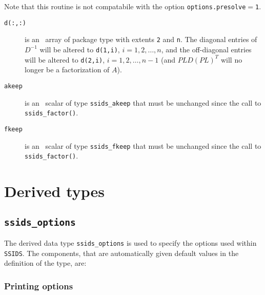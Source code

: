 \vspace{0.3cm}
\noindent
Note that this routine is not compatabile with the option \texttt{options.presolve}$=$\texttt{1}.

\begin{description}

\item[\texttt{d(:,:)}] is an \intentin\ array of package type with
extents {\tt 2}  and {\tt n}. The diagonal entries
of ${D}^{-1}$ will be altered to {\tt d(1,i)}, $i = 1,2,\ldots,n$,
and the off-diagonal entries will be altered to
{\tt d(2,i)}, $i = 1,2,\ldots,n-1$ (and $PLD(PL)^T$ will no longer be
a factorization of $A$).

\item[\texttt{akeep}]  is an \intentin\ scalar of type {\tt ssids\_akeep} that
must be unchanged since the call to {\tt ssids\_factor()}.

\item[\texttt{fkeep}]  is an \intentinout\ scalar of type {\tt ssids\_fkeep}
that must be unchanged since the call to {\tt ssids\_factor()}.

\end{description}


\section{Derived types}
\subsection{\texttt{ssids\_options}}
\label{typeoptions}

The derived data type {\tt ssids\_options} is used to specify the options used
within \texttt{SSIDS}. The components, that are automatically
given default values in the definition of the type, are: \\

\subsubsection*{Printing options}

